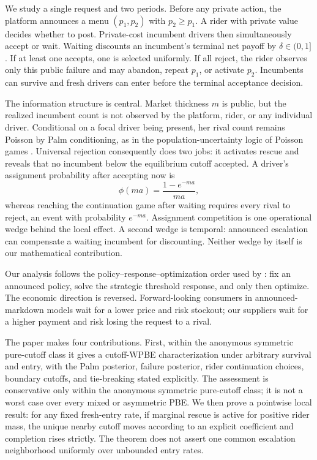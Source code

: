 \documentclass[mnsc,dblanonrev]{informs4}
\newcommand{\ph}{\phi}
\begin{document}
We study a single request and two periods.  Before any private action, the
platform announces a menu $(p_1,p_2)$ with $p_2\ge p_1$.  A rider with private
value decides whether to post.  Private-cost incumbent drivers then
simultaneously accept or wait.  Waiting discounts an incumbent's terminal
net payoff by $\delta\in(0,1]$.  If at least one accepts, one is selected
uniformly.  If all reject, the rider observes only this public failure and may
abandon, repeat $p_1$, or activate $p_2$.  Incumbents can survive and fresh
drivers can enter before the terminal acceptance decision.

The information structure is central.  Market thickness $m$ is public, but
the realized incumbent count is not observed by the platform, rider, or any
individual driver.  Conditional on a focal driver being present, her rival
count remains Poisson by Palm conditioning, as in the population-uncertainty
logic of Poisson games \citep{Myerson1998}.  Universal rejection consequently
does two jobs: it activates rescue and reveals that no incumbent below the
equilibrium cutoff accepted.  A driver's assignment probability after
accepting now is
\[
 \ph(ma)=\frac{1-e^{-ma}}{ma},
\]
whereas reaching the continuation game after waiting requires every rival to
reject, an event with probability $e^{-ma}$.  Assignment competition is one
operational wedge behind the local effect.  A second wedge is temporal:
announced escalation can compensate a waiting incumbent for discounting.
Neither wedge by itself is our mathematical contribution.

Our analysis follows the policy--response--optimization order used by
\citet{AvivPazgal2008}: fix an announced policy, solve the strategic threshold
response, and only then optimize.  The economic direction is reversed.
Forward-looking consumers in announced-markdown models wait for a lower price
and risk stockout; our suppliers wait for a higher payment and risk losing the
request to a rival.

The paper makes four contributions.  First, within the anonymous symmetric
pure-cutoff class it gives a cutoff-WPBE
characterization under arbitrary survival and entry, with the Palm posterior,
failure posterior, rider continuation choices, boundary cutoffs, and
tie-breaking stated explicitly.  The assessment is conservative only within
the anonymous symmetric pure-cutoff class; it is not a worst case over every
mixed or asymmetric PBE.  We then prove a pointwise local result: for any fixed
fresh-entry rate, if marginal rescue is active for positive rider mass, the
unique nearby cutoff moves according to an explicit coefficient and completion
rises strictly.  The theorem does not assert one common escalation neighborhood
uniformly over unbounded entry rates.
\end{document}
